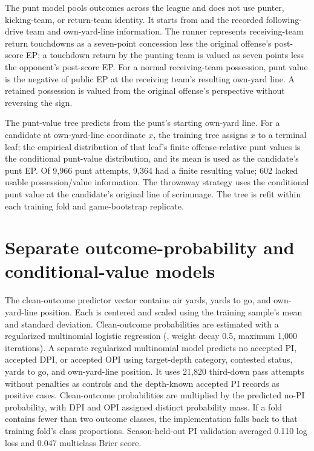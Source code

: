 \documentclass[11pt]{article}
\newcommand{\code}[1]{\texttt{\detokenize{#1}}}
\begin{document}
The punt model pools outcomes across the league and does not use punter, kicking-team, or return-team identity. It starts from \code{data/punt_plays_2022_onward.csv} and the recorded following-drive team and own-yard-line information. The runner represents receiving-team return touchdowns as a seven-point concession less the original offense's post-score EP; a touchdown return by the punting team is valued as seven points less the opponent's post-score EP. For a normal receiving-team possession, punt value is the negative of public EP at the receiving team's resulting own-yard line. A retained possession is valued from the original offense's perspective without reversing the sign.

The punt-value tree predicts from the punt's starting own-yard line. For a candidate at own-yard-line coordinate \(x\), the training tree assigns \(x\) to a terminal leaf; the empirical distribution of that leaf's finite offense-relative punt values is the conditional punt-value distribution, and its mean is used as the candidate's punt EP. Of 9,966 punt attempts, 9,364 had a finite resulting value; 602 lacked usable possession/value information. The throwaway strategy uses the conditional punt value at the candidate's original line of scrimmage. The tree is refit within each training fold and game-bootstrap replicate.

\section{Separate outcome-probability and conditional-value models}

The clean-outcome predictor vector contains air yards, yards to go, and own-yard-line position. Each is centered and scaled using the training sample's mean and standard deviation. Clean-outcome probabilities are estimated with a regularized multinomial logistic regression (\code{nnet::multinom}, weight decay 0.5, maximum 1,000 iterations). A separate regularized multinomial model predicts no accepted PI, accepted DPI, or accepted OPI using target-depth category, contested status, yards to go, and own-yard-line position. It uses 21,820 third-down pass attempts without penalties as controls and the depth-known accepted PI records as positive cases. Clean-outcome probabilities are multiplied by the predicted no-PI probability, with DPI and OPI assigned distinct probability mass. If a fold contains fewer than two outcome classes, the implementation falls back to that training fold's class proportions. Season-held-out PI validation averaged 0.110 log loss and 0.047 multiclass Brier score.
\end{document}

